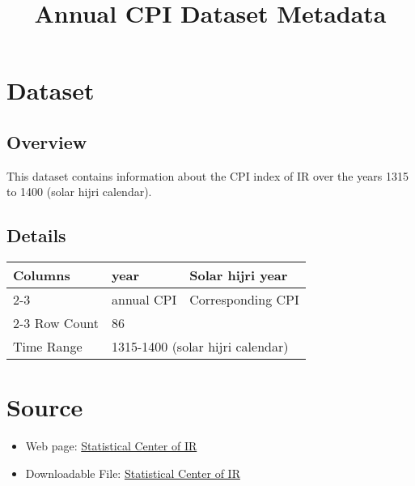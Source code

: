 \documentclass[fleqn]{report}
\begin{document}
\pagestyle{fancy}
\fancyhf{}

\title{Annual CPI Dataset Metadata}
\date{}
\maketitle

\newpage

\chapter*{Dataset}
\section*{Overview}
This dataset contains information about the CPI index of IR over the years 1315 to 1400 (solar hijri calendar).
\section*{Details}
\begin{center}
    \begin{tabular}{|l|ll|}
        \hline
        \multirow{3}{*}{Columns} & \multicolumn{1}{l|}{year}        & Solar hijri year                              \\ \cline{2-3} 
                                 & \multicolumn{1}{l|}{annual CPI}  & Corresponding CPI                             \\ \cline{2-3} \hline
        Row Count                & \multicolumn{2}{l|}{86}                                                          \\ \hline
        Time Range               & \multicolumn{2}{l|}{1315-1400  (solar hijri calendar)}                           \\ \hline
    \end{tabular}
\end{center}

\chapter*{Source}
\begin{itemize}
    \item Web page: \href{https://www.amar.org.ir/%D8%AF%D8%A7%D8%AF%D9%87%D9%87%D8%A7-%D9%88-%D8%A7%D8%B7%D9%84%D8%A7%D8%B9%D8%A7%D8%AA-%D8%A2%D9%85%D8%A7%D8%B1%DB%8C/%D8%B4%D8%A7%D8%AE%D8%B5%D9%87%D8%A7%DB%8C-%D9%82%DB%8C%D9%85%D8%AA/%D8%B4%D8%A7%D8%AE%D8%B5-%D9%82%DB%8C%D9%85%D8%AA-%D9%85%D8%B5%D8%B1%D9%81-%DA%A9%D9%86%D9%86%D8%AF%D9%87#5645851--}{Statistical Center of IR}
    \item Downloadable File: \href{https://www.amar.org.ir/Portals/0/PropertyAgent/461/Files/13025/2302u220311400_V2-14010505.xlsx}{Statistical Center of IR}
\end{itemize}

 
\end{document}
